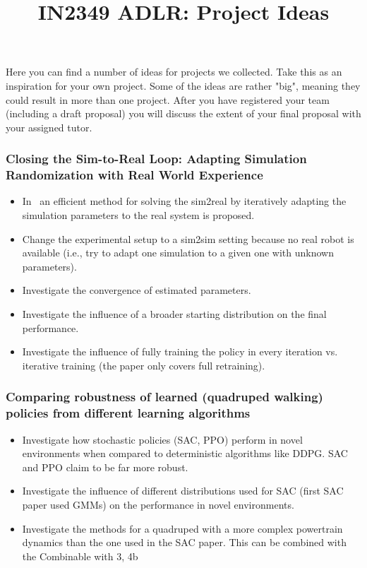 \documentclass[a4paper]{article}
\title{IN2349 ADLR: Project Ideas}
\begin{document}
\maketitle

Here you can find a number of ideas for projects we collected. Take this as an inspiration for your own project. Some of the ideas are rather "big", meaning they could result in more than one project. After you have registered your team (including a draft proposal) you will discuss the extent of your final proposal with your assigned tutor.

\subsubsection{Closing the Sim-to-Real Loop: Adapting Simulation Randomization with Real World Experience}
\begin{itemize}
\item In~\cite{Chebotar2018} an efficient method for solving the sim2real by iteratively adapting the simulation parameters to the real system is proposed.
\item Change the experimental setup to a sim2sim setting because no real robot is available (i.e., try to adapt one simulation to a given one with unknown parameters).
\item Investigate the convergence of estimated parameters.
\item Investigate the influence of a broader starting distribution on the final performance.
\item Investigate the influence of fully training the policy in every iteration vs. iterative training (the paper only covers full retraining).
\end{itemize}

\subsubsection{Comparing robustness of learned (quadruped walking) policies from different learning algorithms}
\begin{itemize}
\item Investigate how stochastic policies (SAC, PPO) perform in novel environments when compared to deterministic algorithms like DDPG. SAC and PPO claim to be far more robust.
\item Investigate the influence of different distributions used for SAC (first SAC paper used GMMs) on the performance in novel environments.
\item Investigate the methods for a quadruped with a more complex powertrain dynamics than the one used in the SAC paper. This can be combined with the Combinable with 3, 4b

\end{itemize}


\end{document}
